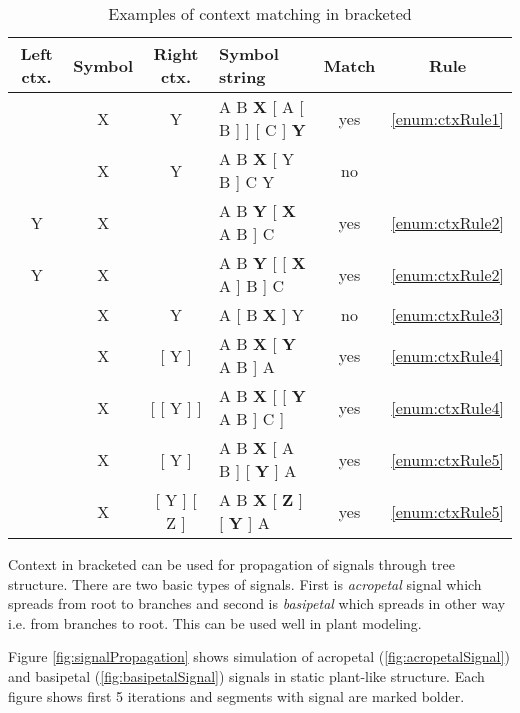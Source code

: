 \begin{table}[ht]
	\centering
	\begin{tabular}{c c c p{128pt} c c}
   		\toprule
   		Left ctx. & Symbol & Right ctx. & Symbol string & Match & Rule\\
   		\midrule
		 & X & Y & A B \textbf{X} [ A [ B ] ] [ C ] \textbf{Y} & yes & \ref{enum:ctxRule1} \\
		 & X & Y & A B \textbf{X} [ Y B ] C Y & no &  \\
		 Y & X & & A B \textbf{Y} [ \textbf{X} A B ] C & yes & \ref{enum:ctxRule2} \\
		 Y & X & & A B \textbf{Y} [ [ \textbf{X} A ] B ] C & yes & \ref{enum:ctxRule2} \\
		 & X & Y & A [ B \textbf{X} ] Y & no & \ref{enum:ctxRule3} \\
		 & X & [ Y ] & A B \textbf{X} [ \textbf{Y} A B ] A  & yes & \ref{enum:ctxRule4} \\
		 & X & [ [ Y ] ] & A B \textbf{X} [ [ \textbf{Y} A B ] C ] & yes & \ref{enum:ctxRule4} \\
		 & X & [ Y ] & A B \textbf{X} [ A B ] [ \textbf{Y} ] A  & yes & \ref{enum:ctxRule5} \\
		 & X & [ Y ] [ Z ] & A B \textbf{X} [ \textbf{Z} ] [ \textbf{Y} ] A  & yes & \ref{enum:ctxRule5} \\
		\bottomrule
	\end{tabular}
	\caption{Examples of context matching in bracketed \lsystems}
	\label{tbl:bracketCtxt}
\end{table}

Context in bracketed \lsystems can be used for propagation of signals through tree structure.
There are two basic types of signals.
First is \emph{acropetal} signal which spreads from root to branches and second is \emph{basipetal} which spreads in other way i.e. from branches to root.
This can be used well in plant modeling.

Figure \ref{fig:signalPropagation} shows simulation of acropetal (\ref{fig:acropetalSignal}) and basipetal (\ref{fig:basipetalSignal}) signals in static plant-like structure.
Each figure shows first 5 iterations and segments with signal are marked bolder.

